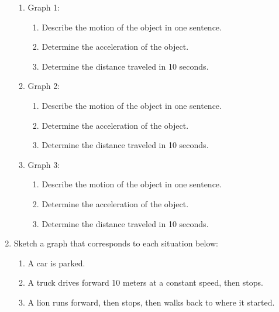 \documentclass[letterpaper, 12pt]{article}
\begin{document}
\begin{enumerate}
\begin{enumerate}
	\item Graph 1: 
	\begin{enumerate}
		\item Describe the motion of the object in one sentence.
		\vspace{0.3in}
		\item Determine the acceleration of the object.
		\vspace{0.3in}
		\item Determine the distance traveled in 10 seconds.
		\vspace{0.3in}
		
	\end{enumerate}
	\item Graph 2:
		\begin{enumerate}
		\item Describe the motion of the object in one sentence.
		\vspace{0.3in}
		\item Determine the acceleration of the object.
		\vspace{0.3in}
		\item Determine the distance traveled in 10 seconds.
		\vspace{0.3in}
		
	\end{enumerate}

	\item Graph 3:
		\begin{enumerate}
		\item Describe the motion of the object in one sentence.
		\vspace{0.3in}
		\item Determine the acceleration of the object.
		\vspace{0.3in}
		\item Determine the distance traveled in 10 seconds.
		\vspace{0.3in}
		
	\end{enumerate}
	
	
	
	\end{enumerate}

\newpage
\item Sketch a graph that corresponds to each situation below:
\begin{enumerate}
	\item A car is parked.
	\item A truck drives forward 10 meters at a constant speed, then stops.
	\item A lion runs forward, then stops, then walks back to where it started.
\end{enumerate}


\end{enumerate}
\end{document}
